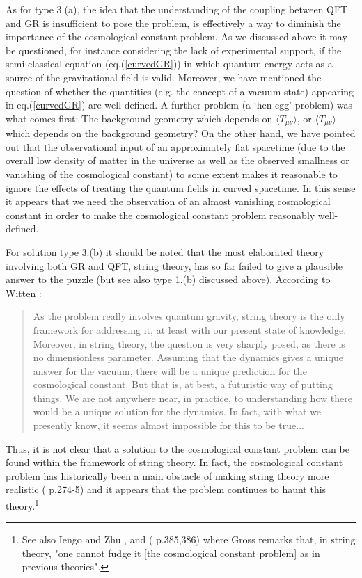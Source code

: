 \documentclass[12pt]{article}
\begin{document}
As for type 3.(a), the idea that the understanding of the coupling
between QFT and GR is insufficient to pose the problem, is
effectively a way to diminish the importance of the cosmological
constant problem. As we discussed above it may be questioned, for
instance considering the lack of experimental support, if the
semi-classical equation (eq.(\ref{curvedGR})) in which quantum
energy acts as a source of the gravitational field is valid.
Moreover, we have mentioned the question of whether the quantities
(e.g. the concept of a vacuum state) appearing in
eq.(\ref{curvedGR}) are well-defined. A further problem (a
`hen-egg' problem) was what comes first: The background geometry
which depends on $\langle T_{\mu\nu} \rangle $, or $\langle T_{\mu\nu} \rangle $ which depends
on the background geometry? On the other hand, we have pointed out
that the observational input of an approximately flat spacetime
(due to the overall low density of matter in the universe as well
as the observed smallness or vanishing of the cosmological
constant) to some extent makes it reasonable to ignore the effects
of treating the quantum fields in curved spacetime. In this sense
it appears that we need the observation of an almost vanishing
cosmological constant in order to make the cosmological constant
problem reasonably well-defined. 

For solution type 3.(b) it should be noted that the most
elaborated theory involving both GR and QFT, string theory, has so
far failed to give a plausible answer to the puzzle (but see also
type 1.(b) discussed above). According to
Witten \cite{witten00}:
\begin{quote}  
As the problem really involves quantum gravity, string theory
is the only framework for addressing it, at least with our
present state of knowledge. Moreover, in string theory, the 
question is very sharply posed, as there is no dimensionless
parameter. Assuming that the dynamics gives a unique answer
for the vacuum, there will be a unique prediction for the
cosmological constant. But that is, at best, a futuristic
way of putting things. We are not anywhere near, in practice,
to understanding how there would be a unique solution for
the dynamics. In fact, with what we presently know, it seems
almost impossible for this to be true...
\end{quote}
Thus, it is not clear that a solution to the cosmological constant
problem can be found within the framework of string theory. In
fact, the cosmological constant problem has historically been a
main obstacle of making string theory more realistic
(\cite{witten97} p.274-5) and it appears that the problem
continues to haunt this theory.\footnote{See also Iengo and Zhu
\cite{iengo99}, and (\cite{cao99} p.385,386) where Gross remarks
that, in string theory, "one cannot fudge it [the cosmological
constant problem] as in previous theories".} 
\end{document}
